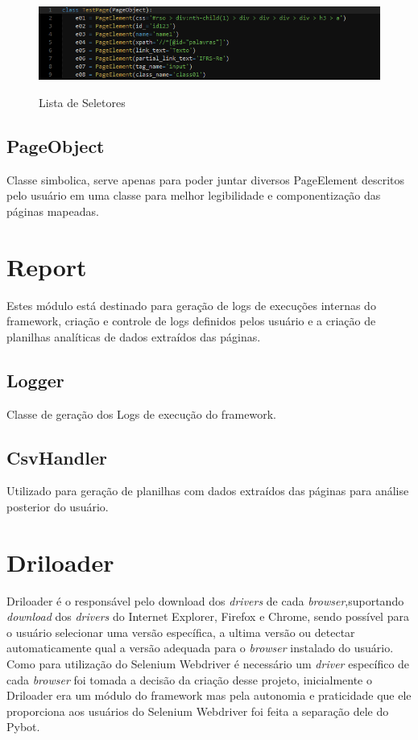             \begin{figure}[H]
                \vspace*{0,3cm}
                \centering
                \caption{Lista de Seletores}
                \includegraphics[width=1\textwidth]{./04-figuras/selectors}
                \label{fig:selectors.png}
            \end{figure}

        \subsection{PageObject}
            Classe simbolica, serve apenas para poder juntar diversos PageElement descritos pelo usuário em uma classe para melhor
            legibilidade e componentização das páginas mapeadas.

    \section{Report}

        Estes módulo está destinado para geração de logs de execuções internas do framework, criação e controle
        de logs definidos pelos usuário e a criação de planilhas analíticas de dados extraídos das páginas.

        \subsection{Logger}
        Classe de geração dos Logs de execução do framework.

        \subsection{CsvHandler}
        Utilizado para geração de planilhas com dados extraídos das páginas para análise posterior do usuário.

    \section{Driloader}
    \label{driloader}
        Driloader é o responsável pelo download dos \textit{drivers} de cada \emph{browser},suportando \textit{download} dos \textit{drivers} do Internet Explorer,
        Firefox e Chrome, sendo possível para o usuário selecionar uma versão específica, a ultima versão ou detectar automaticamente qual a versão adequada para o \emph{browser} instalado do usuário. Como para utilização do Selenium
        Webdriver é necessário um \textit{driver} específico de cada \emph{browser} foi tomada a decisão da criação desse projeto,
        inicialmente o Driloader era um módulo do framework mas pela autonomia e praticidade que ele proporciona aos usuários do Selenium Webdriver foi feita a separação dele do Pybot.



